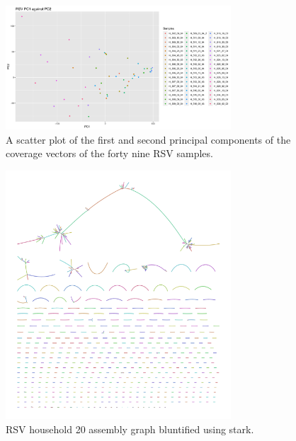 \documentclass[10pt, a4paper]{article}
\begin{document}
\begin{figure}[h]
\centering
\includegraphics[width=0.75\textwidth]{../Figures/RSV/PCA.png}
\caption[RSV PCA]{\label{fig:org2d033e8}A scatter plot of the first and second principal components of the coverage vectors of the forty nine RSV samples.}
\end{figure}


\begin{figure}[h]
\centering
\includegraphics[width=0.75\textwidth]{../Figures/RSV/Assembly_Bluntified.png}
\caption[Bluntified RSV Assembly Graph]{\label{fig:org5f4df90}RSV household 20 assembly graph bluntified using stark.}
\end{figure}
\end{document}
